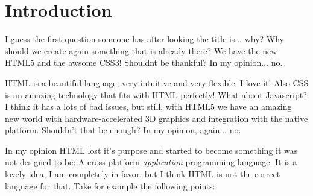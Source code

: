 \documentclass[a4paper]{article}
\begin{document}


\section{Introduction}
I guess the first question someone has after looking the title is... why? Why should we create again something that is already there? We have the new HTML5 and the awsome CSS3! Shouldn\'t be thankful? In my opinion... no.

HTML is a beautiful language, very intuitive and very flexible. I love it! Also CSS is an amazing technology that fits with HTML perfectly! What about Javascript? I think it has a lots of bad issues, but still, with HTML5 we have an amazing new world with hardware-accelerated 3D graphics and integration with the native platform. Shouldn't that be enough? In my opinion, again... no.

In my opinion HTML lost it's purpose and started to become something it was not designed to be: A cross platform \emph{application} programming language. It is a lovely idea, I am completely in favor, but I think HTML is not the correct language for that. Take for example the following points:
\end{document}
